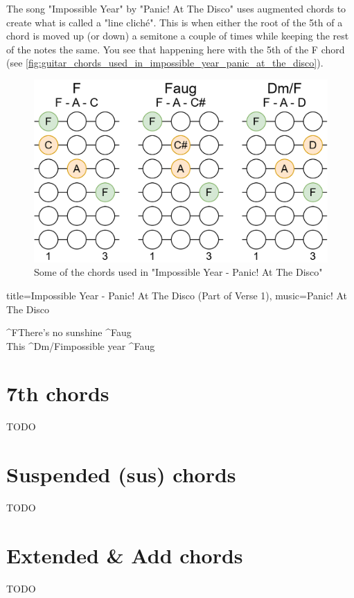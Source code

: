 
The song "Impossible Year" by "Panic! At The Disco" uses augmented chords to create what is called a "line cliché". This is when either the root of the 5th of a chord is moved up (or down) a semitone a couple of times while keeping the rest of the notes the same. You see that happening here with the 5th of the F chord (see \autoref{fig:guitar_chords_used_in_impossible_year_panic_at_the_disco}).

\begin{figure}[h]
	\centering
	\includegraphics[height=0.16\textheight]{../../Images/ChordsUsedInImpossibleYearPanicAtTheDisco.png}
	\caption{Some of the chords used in "Impossible Year - Panic! At The Disco"}
	\label{fig:guitar_chords_used_in_impossible_year_panic_at_the_disco}
\end{figure}

\begin{song}[verse/numbered, align-chords=l]{title={Impossible Year - Panic! At The Disco (Part of Verse 1)}, music={Panic! At The Disco}}
	\begin{chorus}
		^{F}There's no sunshine ^{Faug} \\
		This ^{Dm/F}impossible year ^{Faug} \\
	\end{chorus}
\end{song}

\newpage

\section{7th chords}
TODO

\newpage

\section{Suspended (sus) chords}
TODO

\newpage

\section{Extended \& Add chords}
TODO
